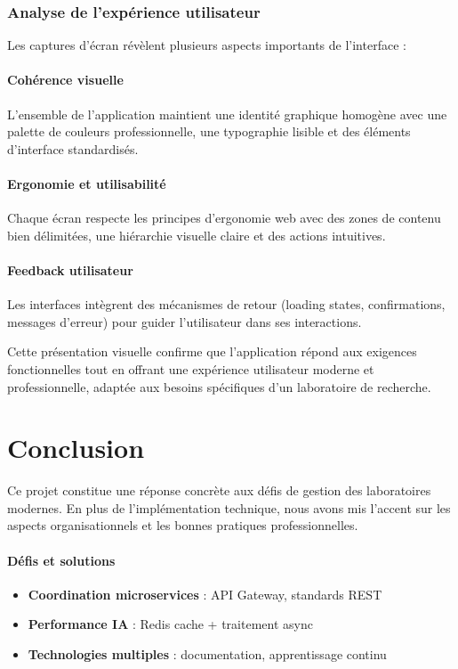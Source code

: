 \documentclass[12pt]{rapportPfe}
\begin{document}
\subsubsection{Analyse de l'expérience utilisateur}

Les captures d'écran révèlent plusieurs aspects importants de l'interface :

\paragraph{Cohérence visuelle}
L'ensemble de l'application maintient une identité graphique homogène avec une palette de couleurs professionnelle, une typographie lisible et des éléments d'interface standardisés.

\paragraph{Ergonomie et utilisabilité}
Chaque écran respecte les principes d'ergonomie web avec des zones de contenu bien délimitées, une hiérarchie visuelle claire et des actions intuitives.

\paragraph{Feedback utilisateur}
Les interfaces intègrent des mécanismes de retour (loading states, confirmations, messages d'erreur) pour guider l'utilisateur dans ses interactions.

Cette présentation visuelle confirme que l'application répond aux exigences fonctionnelles tout en offrant une expérience utilisateur moderne et professionnelle, adaptée aux besoins spécifiques d'un laboratoire de recherche.

\newpage
\section{Conclusion}
Ce projet constitue une réponse concrète aux défis de gestion des laboratoires modernes. En plus de l'implémentation technique, nous avons mis l'accent sur les aspects organisationnels et les bonnes pratiques professionnelles.

\paragraph{Défis et solutions}
\begin{itemize}
    \item \textbf{Coordination microservices} : API Gateway, standards REST
    \item \textbf{Performance IA} : Redis cache + traitement async
    \item \textbf{Technologies multiples} : documentation, apprentissage continu
\end{itemize}
\end{document}
